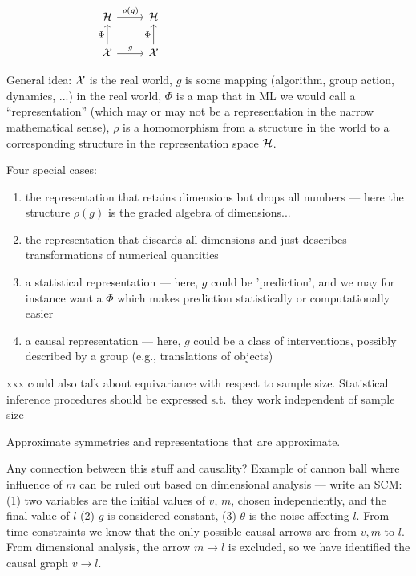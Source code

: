 \documentclass{article}
\begin{document}
$$
\begin{tikzcd}[]%
  {\cal H}\arrow[r,"\rho(g)"] & {\cal H}\\
{\cal X} \arrow[u,"\Phi"] \arrow[r,"g"] & {\cal X} \arrow[u,"\Phi"]
\end{tikzcd}
~~~~~~~~~~~~~~~~~~~~~~~~~~~~~~~~~~~~~~~~~~
$$

General idea: $\cal X$ is the real world, $g$ is some mapping (algorithm, group action, dynamics, ...) in the real world, $\Phi$ is a map that in ML we would call a ``representation'' (which may or may not be a representation in the narrow mathematical sense), $\rho$ is a homomorphism from a structure in the world to a corresponding structure in the representation space $\cal H$.

Four special cases:
\begin{enumerate}
    \item the representation that retains dimensions but drops all numbers --- here the structure $\rho(g)$ is the graded algebra of dimensions...
    \item the representation that discards all dimensions and just describes transformations of numerical quantities
    \item a statistical representation --- here, $g$ could be 'prediction', and we may for instance want a $\Phi$ which makes prediction statistically or computationally easier
    \item a causal representation --- here, $g$ could be a class of interventions, possibly described by a group (e.g., translations of objects)
\end{enumerate}

xxx could also talk about equivariance with respect to sample size. Statistical inference procedures should be expressed s.t.\ they work independent of sample size



Approximate symmetries and representations that are approximate.

Any connection between this stuff and causality?
Example of cannon ball where influence of $m$ can be ruled out based on dimensional analysis --- write an SCM: (1) two variables are the initial values of $v$, $m$, chosen independently, and the final value of $l$ (2) $g$ is considered constant, (3) $\theta$ is the noise affecting $l$. From time constraints we know that the only possible causal arrows are from $v, m$ to $l$. From dimensional analysis, the arrow $m\to l$ is excluded, so we have identified the causal graph $v\to l$.
\end{document}
